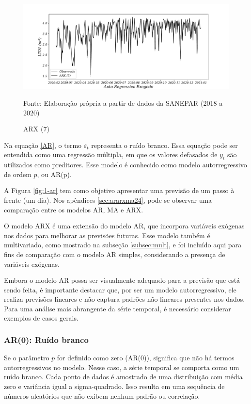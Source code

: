 \begin{figure}[H]
	\centering
	\caption{ARX (7)}
	\label{fig:1-arx}
	\includegraphics[width=0.9\linewidth]{Modelos/Figuras/0-ARX}
	
	Fonte: Elaboração própria a partir de dados da SANEPAR (2018 a 2020)
\end{figure}



Na equação \eqref{AR}, o termo $\varepsilon_t$ representa o ruído branco. Essa equação pode ser entendida como uma regressão múltipla, em que os valores defasados de $y_t$ são utilizados como preditores. Esse modelo é conhecido como modelo autorregressivo de ordem $p$, ou AR(p).

A Figura \ref{fig:1-ar} tem como objetivo apresentar uma previsão de um passo à frente (um dia). Nos apêndices \ref{sec:ararxma24}, pode-se observar uma comparação entre os modelos AR, MA e ARX.

O modelo ARX é uma extensão do modelo AR, que incorpora variáveis exógenas nos dados para melhorar as previsões futuras. Esse modelo também é multivariado, como mostrado na subseção \ref{subsec:mult}, e foi incluído aqui para fins de comparação com o modelo AR simples, considerando a presença de variáveis exógenas.

Embora o modelo AR possa ser visualmente adequado para a previsão que está sendo feita, é importante destacar que, por ser um modelo autorregressivo, ele realiza previsões lineares e não captura padrões não lineares presentes nos dados. Para uma análise mais abrangente da série temporal, é necessário considerar exemplos de casos gerais.

\subsubsection{AR(0): Ru\'ido branco}

Se o parâmetro $p$ for definido como zero (AR($0$)), significa que não há termos autorregressivos no modelo. Nesse caso, a série temporal se comporta como um ruído branco. Cada ponto de dados é amostrado de uma distribuição com média zero e variância igual a sigma-quadrado. Isso resulta em uma sequência de números aleatórios que não exibem nenhum padrão ou correlação.

